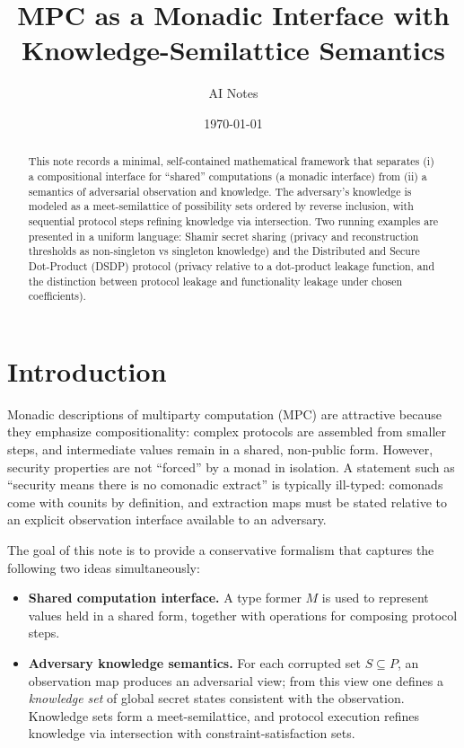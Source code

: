 \documentclass[11pt,a4paper]{article}
\title{MPC as a Monadic Interface with Knowledge-Semilattice Semantics}
\author{AI Notes}
\date{\today}
\theoremstyle{definition}
\theoremstyle{remark}
\newcommand{\Parties}{P}
\begin{document}
\maketitle

\begin{abstract}
This note records a minimal, self-contained mathematical framework that separates (i) a compositional interface for ``shared'' computations (a monadic interface) from (ii) a semantics of adversarial observation and knowledge. The adversary's knowledge is modeled as a meet-semilattice of possibility sets ordered by reverse inclusion, with sequential protocol steps refining knowledge via intersection. Two running examples are presented in a uniform language: Shamir secret sharing (privacy and reconstruction thresholds as non-singleton vs singleton knowledge) and the Distributed and Secure Dot-Product (DSDP) protocol (privacy relative to a dot-product leakage function, and the distinction between protocol leakage and functionality leakage under chosen coefficients).
\end{abstract}

\section{Introduction}
\label{sec:introduction}

Monadic descriptions of multiparty computation (MPC) are attractive because they emphasize compositionality: complex protocols are assembled from smaller steps, and intermediate values remain in a shared, non-public form. However, security properties are not ``forced'' by a monad in isolation. A statement such as ``security means there is no comonadic extract'' is typically ill-typed: comonads come with counits by definition, and extraction maps must be stated relative to an explicit observation interface available to an adversary.

The goal of this note is to provide a conservative formalism that captures the following two ideas simultaneously:
\begin{itemize}[leftmargin=2em]
  \item \textbf{Shared computation interface.} A type former \(M\) is used to represent values held in a shared form, together with operations for composing protocol steps.
  \item \textbf{Adversary knowledge semantics.} For each corrupted set \(S \subseteq \Parties\), an observation map produces an adversarial view; from this view one defines a \emph{knowledge set} of global secret states consistent with the observation. Knowledge sets form a meet-semilattice, and protocol execution refines knowledge via intersection with constraint-satisfaction sets.
\end{itemize}
\end{document}

